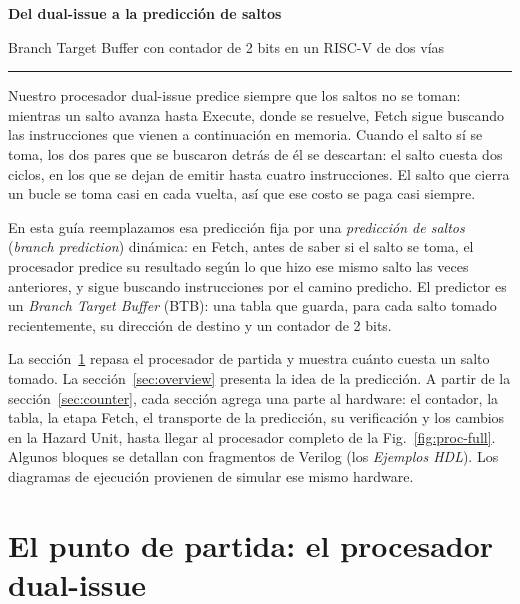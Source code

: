 \documentclass[11pt,a4paper]{article}
\begin{document}
\begin{center}
  {\sffamily\bfseries\huge\color{hhblue} Del dual-issue a la predicción de saltos\par}
  \vspace{0.6ex}
  {\sffamily\large Branch Target Buffer con contador de 2 bits en un RISC-V de dos vías\par}
  \vspace{1.2ex}
  \rule{\linewidth}{0.4pt}
\end{center}
\vspace{1ex}

Nuestro procesador dual-issue predice siempre que los saltos no se toman: mientras un salto
avanza hasta Execute, donde se resuelve, Fetch sigue buscando las instrucciones que vienen a
continuación en memoria. Cuando el salto sí se toma, los dos pares que se buscaron detrás
de él se descartan: el salto cuesta dos ciclos, en los que se dejan de emitir hasta cuatro
instrucciones. El salto que cierra un bucle se toma casi en cada vuelta, así que ese costo
se paga casi siempre.

En esta guía reemplazamos esa predicción fija por una \emph{predicción de saltos}
(\emph{branch prediction}) dinámica: en Fetch, antes de saber si el salto se toma, el
procesador predice su resultado según lo que hizo ese mismo salto las veces anteriores, y
sigue buscando instrucciones por el camino predicho. El predictor es un \emph{Branch Target
Buffer} (BTB): una tabla que guarda, para cada salto tomado recientemente, su dirección de
destino y un contador de 2 bits.

La sección~\ref{sec:base} repasa el procesador de partida y muestra cuánto cuesta un salto
tomado. La sección~\ref{sec:overview} presenta la idea de la predicción. A partir de la
sección~\ref{sec:counter}, cada sección agrega una parte al hardware: el contador, la tabla,
la etapa Fetch, el transporte de la predicción, su verificación y los cambios en la Hazard
Unit, hasta llegar al procesador completo de la Fig.~\ref{fig:proc-full}. Algunos bloques se
detallan con fragmentos de Verilog (los \emph{Ejemplos HDL}). Los diagramas de ejecución
provienen de simular ese mismo hardware.

\section{El punto de partida: el procesador dual-issue}
\label{sec:base}
\end{document}
